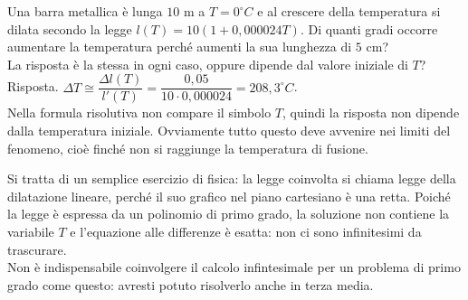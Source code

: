 \begin{esempio}
 Una barra metallica è lunga $10$ m a $T=0 ^\circ C$ e al crescere della 
 temperatura si dilata secondo la legge $l(T)=10(1+0,000024T)$. Di quanti gradi 
 occorre aumentare la temperatura perché aumenti la sua lunghezza di $5$ cm?\\
 La risposta è la stessa in ogni caso, oppure dipende dal valore iniziale di 
 $T$?\\
 Risposta. $\Delta T\cong \dfrac{\Delta l(T)}{l'(T)}=\dfrac{0,05}
 {10\cdot 0,000024}=208,3 ^\circ C$.\\
 Nella formula risolutiva non compare il simbolo $T$, quindi la risposta non 
 dipende dalla temperatura iniziale. Ovviamente tutto questo deve avvenire nei 
 limiti del fenomeno, cioè finché non si raggiunge la temperatura di fusione.
 \begin{osservazione}
  Si tratta di un semplice esercizio di fisica: la legge coinvolta si chiama
  legge della dilatazione lineare, perché il suo grafico nel piano cartesiano 
  è una retta. Poiché la legge è espressa da un polinomio di primo grado, la 
  soluzione non contiene la variabile $T$ e l'equazione alle differenze è
  esatta: non ci sono infinitesimi da trascurare.\\
  Non è indispensabile coinvolgere il calcolo infintesimale per un problema di
  primo grado come questo: avresti potuto risolverlo anche in terza media.
 \end{osservazione}

\end{esempio}

